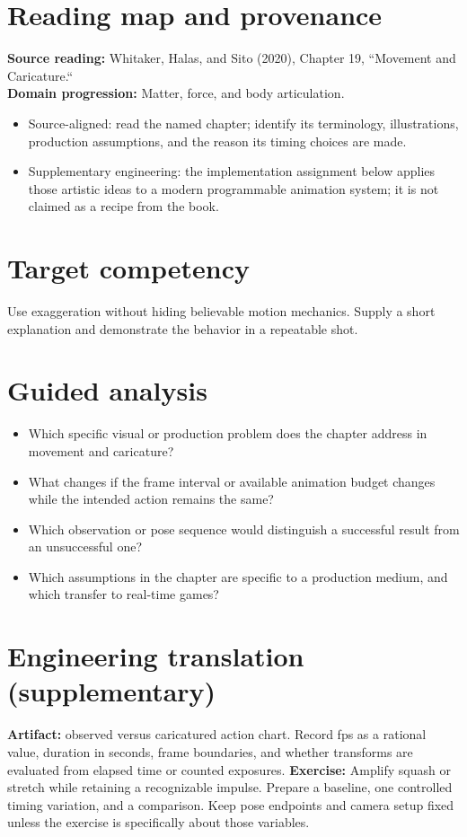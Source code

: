 \documentclass[10pt,letterpaper]{article}
\begin{document}
\makedoctitle
\makedocsummary

\section{Reading map and provenance}
\textbf{Source reading:} Whitaker, Halas, and Sito (2020), Chapter 19, ``Movement and Caricature.``\\
\textbf{Domain progression:} Matter, force, and body articulation.
\begin{itemize}
\item Source-aligned: read the named chapter; identify its terminology, illustrations, production assumptions, and the reason its timing choices are made.
\item Supplementary engineering: the implementation assignment below applies those artistic ideas to a modern programmable animation system; it is not claimed as a recipe from the book.
\end{itemize}
\section{Target competency}
Use exaggeration without hiding believable motion mechanics. Supply a short explanation and demonstrate the behavior in a repeatable shot.
\section{Guided analysis}
\begin{itemize}
\item Which specific visual or production problem does the chapter address in movement and caricature?
\item What changes if the frame interval or available animation budget changes while the intended action remains the same?
\item Which observation or pose sequence would distinguish a successful result from an unsuccessful one?
\item Which assumptions in the chapter are specific to a production medium, and which transfer to real-time games?
\end{itemize}
\section{Engineering translation (supplementary)}
\textbf{Artifact:} observed versus caricatured action chart. Record fps as a rational value, duration in seconds, frame boundaries, and whether transforms are evaluated from elapsed time or counted exposures.
\textbf{Exercise:} Amplify squash or stretch while retaining a recognizable impulse. Prepare a baseline, one controlled timing variation, and a comparison. Keep pose endpoints and camera setup fixed unless the exercise is specifically about those variables.
\end{document}
